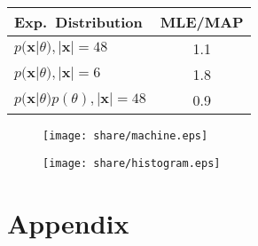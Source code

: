 \documentclass[a4paper, twocolumn]{article}
\begin{document}
    \newpage

    \begin{table}[h!]
    \begin{center}
    \begin{tabular}{lc}
        \toprule
            \textbf{Exp.\ Distribution} & \textbf{MLE/MAP} \\
        \midrule
            $p(\bm{x}|\theta), |\bm{x}|=48$ & 1.1 \\
            $p(\bm{x}|\theta), |\bm{x}|=6$ & 1.8 \\
            $p(\bm{x}|\theta)p(\theta), |\bm{x}|=48$ & 0.9 \\
        \bottomrule
    \end{tabular}
    \end{center}
    \end{table}

    \begin{figure}[h!]
        \centering
        \texttt{[image: share/machine.eps]}
    \end{figure}

    \begin{figure}[h!]
        \centering
        \texttt{[image: share/histogram.eps]}
    \end{figure}

    \clearpage \nocite{*}
    
    

    \onecolumn \appendix
    \section*{Appendix}

    
    
    
    
    
    
\end{document}
